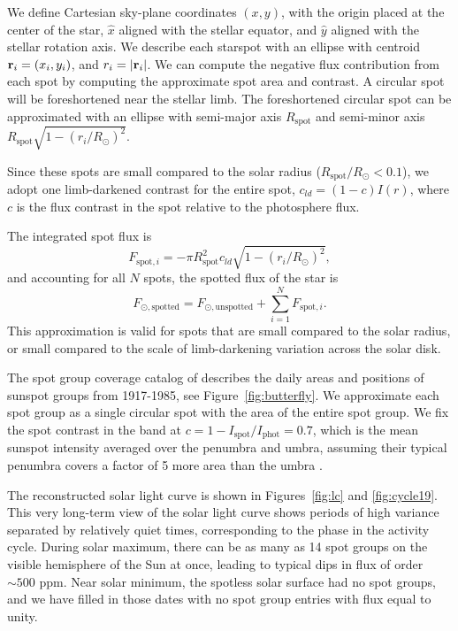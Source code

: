 We define Cartesian sky-plane coordinates $(x,y)$, with the origin placed at the center of the star, $\hat{x}$  aligned with the stellar equator, and $\hat{y}$ aligned with the stellar rotation axis. We describe each starspot with an ellipse with centroid ${\bf r}_i = (x_i, y_i)$, and $r_i = \vert {\bf r}_i \vert$.  We can compute the negative flux contribution from each spot by computing the approximate spot area and contrast. A circular spot will be foreshortened near the stellar limb. The foreshortened circular spot can be approximated with an ellipse with semi-major axis $R_{\mathrm{spot}}$ and semi-minor axis $R_{\mathrm{spot}} \sqrt{1 - (r_i/R_\odot)^2}$. 

Since these spots are small compared to the solar radius ($R_{\mathrm{spot}}/R_\odot < 0.1$), we adopt one limb-darkened contrast for the entire spot, $c_{ld} = (1-c) I(r)$, where $c$ is the flux contrast in the spot relative to the photosphere flux. 

The integrated spot flux is 
\begin{equation}
F_{\mathrm{spot}, i} = - \pi R_{\mathrm{spot}}^2 c_{ld} \sqrt{1 - (r_i/R_\odot)^2}, 
\end{equation}
and accounting for all $N$ spots, the spotted flux of the star is
\begin{equation}
F_{\odot, \mathrm{spotted}} = F_{\odot, \mathrm{unspotted}}  + \sum_{i=1}^{N} F_{\mathrm{spot}, i}.
\end{equation}
This approximation is valid for spots that are small compared to the solar radius, or small compared to the scale of limb-darkening variation across the solar disk.

The spot group coverage catalog of \citet{Howard1984} describes the daily areas and positions of sunspot groups from 1917-1985, see Figure~\ref{fig:butterfly}. We approximate each spot group as a single circular spot with the area of the entire spot group. We fix the spot contrast in the \kepler band at $c = 1 - I_\mathrm{spot}/I_\mathrm{phot} = 0.7$, which is the mean sunspot intensity averaged over the penumbra and umbra, assuming their typical penumbra covers a factor of 5 more area than the umbra \citep{Solanki2003}. 

The reconstructed solar light curve is shown in Figures~\ref{fig:lc} and \ref{fig:cycle19}. This very long-term view of the solar light curve shows periods of high variance separated by relatively quiet times, corresponding to the phase in the activity cycle. During solar maximum, there can be as many as 14 spot groups on the visible hemisphere of the Sun at once, leading to typical dips in flux of order $\sim 500$ ppm. Near solar minimum, the spotless solar surface had no spot groups, and we have filled in those dates with no spot group entries with flux equal to unity. 

